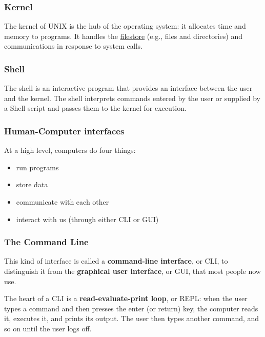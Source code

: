 \documentclass[
]{book}
\providecommand{\tightlist}{%
  \setlength{\itemsep}{0pt}\setlength{\parskip}{0pt}}
\begin{document}
\hypertarget{kernel}{%
\subsubsection{Kernel}\label{kernel}}

The kernel of UNIX is the hub of the operating system: it allocates time and memory to programs. It handles the \href{http://users.ox.ac.uk/~martinw/unix/chap3.html}{filestore} (e.g., files and directories) and communications in response to system calls.

\hypertarget{shell}{%
\subsubsection{Shell}\label{shell}}

The shell is an interactive program that provides an interface between the user and the kernel. The shell interprets commands entered by the user or supplied by a Shell script and passes them to the kernel for execution.

\hypertarget{human-computer-interfaces}{%
\subsubsection{Human-Computer interfaces}\label{human-computer-interfaces}}

At a high level, computers do four things:

\begin{itemize}
\tightlist
\item
  run programs
\item
  store data
\item
  communicate with each other
\item
  interact with us (through either CLI or GUI)
\end{itemize}

\hypertarget{the-command-line-1}{%
\subsubsection{The Command Line}\label{the-command-line-1}}

This kind of interface is called a \textbf{command-line interface}, or CLI,
to distinguish it from the \textbf{graphical user interface}, or GUI, that most people now use.

The heart of a CLI is a \textbf{read-evaluate-print loop}, or REPL: when the user types a command and then presses the enter (or return) key, the computer reads it, executes it, and prints its output. The user then types another command, and so on until the user logs off.
\end{document}
